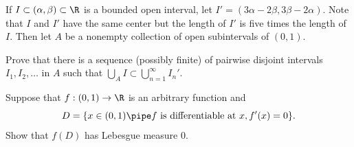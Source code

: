 If $I\subset (\alpha,\beta)\subset \R$ is a bounded open interval, let
$I'=(3\alpha-2\beta,3\beta-2\alpha)$. Note that $I$ and $I'$ have the
same center but the length of $I'$ is five times the length of
$I$. Then let $A$ be a nonempty collection of open subintervals of
$(0,1)$.
\begin{alist}
\item Prove that there is a sequence (possibly finite) of pairwise
disjoint intervals $I_1,I_2,\ldots $ in $A$ such that $\bigcup_A
I\subset \bigcup_{n=1}^{\infty}I_n'$.
\item Suppose that $f:(0,1)\rightarrow \R$ is an arbitrary function 
and $$D=\{x\in (0,1)\pipe f \text{\ is differentiable at\ } x,
f'(x)=0\}.$$ Show that $f(D)$ has Lebesgue measure $0$.
\end{alist}
